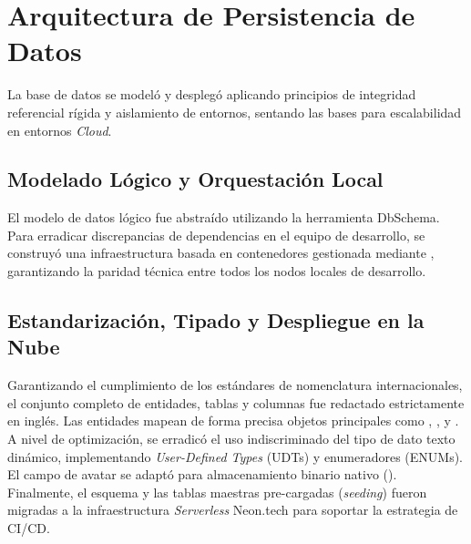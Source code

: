 \section{Arquitectura de Persistencia de Datos}
\label{sec:base_datos}

La base de datos se modeló y desplegó aplicando principios de integridad referencial rígida y aislamiento de entornos, sentando las bases para escalabilidad en entornos \textit{Cloud}.

\subsection{Modelado Lógico y Orquestación Local}
El modelo de datos lógico fue abstraído utilizando la herramienta DbSchema. Para erradicar discrepancias de dependencias en el equipo de desarrollo, se construyó una infraestructura basada en contenedores gestionada mediante , garantizando la paridad técnica entre todos los nodos locales de desarrollo. 

\subsection{Estandarización, Tipado y Despliegue en la Nube}
Garantizando el cumplimiento de los estándares de nomenclatura internacionales, el conjunto completo de entidades, tablas y columnas fue redactado estrictamente en inglés. Las entidades mapean de forma precisa objetos principales como , ,  y . 
A nivel de optimización, se erradicó el uso indiscriminado del tipo de dato texto dinámico, implementando \textit{User-Defined Types} (UDTs) y enumeradores (ENUMs). El campo de avatar se adaptó para almacenamiento binario nativo (). Finalmente, el esquema y las tablas maestras pre-cargadas (\textit{seeding}) fueron migradas a la infraestructura \textit{Serverless} Neon.tech para soportar la estrategia de CI/CD.
